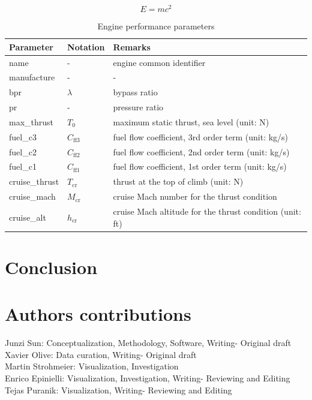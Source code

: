 \documentclass[
  manuscript=article,  %
  layout=preprint,  %
  year=20xx,
  volume=x,
]{extra/joas}
\begin{document}
\blindtext

\begin{equation}
  E = m c^2
\end{equation}

\blindtext

\begin{table}[H]
  \centering
  \small
  \caption{Engine performance parameters}
  \label{tb:eng_perf_params}
  \begin{tabular}{lll}
  \toprule
  \textbf{Parameter} & \textbf{Notation} & \textbf{Remarks} \\
  \midrule
  name & - & engine common identifier \\
  manufacture & - & -  \\
  bpr & $\lambda$ & bypass ratio \\
  pr & - & pressure ratio \\
  max\_thrust & $T_0$ & maximum static thrust, sea level (unit: N) \\
  fuel\_c3 & $C_\mathrm{ff3}$ & fuel flow coefficient, 3rd order term (unit: kg/s) \\
  fuel\_c2 & $C_\mathrm{ff2}$ & fuel flow coefficient, 2nd order term (unit: kg/s) \\
  fuel\_c1 & $C_\mathrm{ff1}$ & fuel flow coefficient, 1st order term (unit: kg/s) \\
  cruise\_thrust & $T_\mathrm{cr}$ & thrust at the top of climb (unit: N) \\
  cruise\_mach & $M_\mathrm{cr}$ & cruise Mach number for the thrust condition \\
  cruise\_alt & $h_\mathrm{cr}$ & cruise Mach altitude for the thrust condition (unit: ft) \\
  \bottomrule
  \end{tabular}
\end{table}

\blindtext

\section{Conclusion}

\Blindtext

\section*{Authors contributions}
Junzi Sun: Conceptualization, Methodology, Software, Writing- Original draft \\
Xavier Olive: Data curation, Writing- Original draft \\
Martin Strohmeier: Visualization, Investigation \\
Enrico Epinielli: Visualization, Investigation, Writing- Reviewing and Editing \\
Tejas Puranik: Visualization, Writing- Reviewing and Editing
\end{document}
